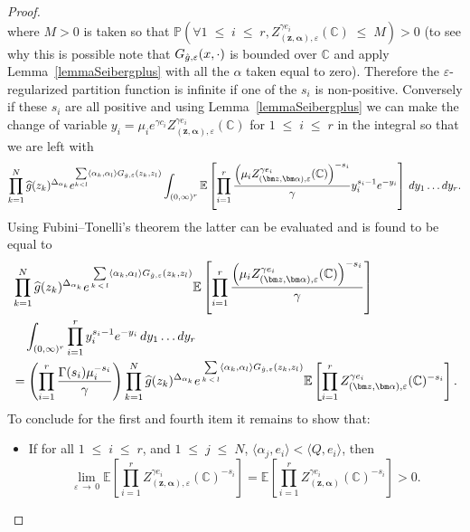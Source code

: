 \documentclass[AHL,Unicode,longabstracts,published]{cedram}
\renewcommand{\leq}{\;\leqslant\;}
\newcommand{\C}{\mathbb{C}}
\newcommand{\E}{\mathbb{E}}
\newcommand{\bbP}{\mathbb{P}}
\newcommand{\ps}[1]{\langle #1 \rangle}
\newcommand*\eps{\varepsilon}
\let\oldhat\hat
\renewcommand*{\hat}[1]{\mathchoice{\widehat{#1}}{\widehat{#1}}{\oldhat{#1}}{\oldhat{#1}}}
\let\oldforall\forall
\renewcommand*{\forall}{\mathrel{\oldforall}}
\begin{document}
\begin{proof}
\[\]
where $M>0$ is taken so that $\bbP\left(\forall 1\leq i\leq r,Z_{(\bm z,\bm \alpha),\eps}^{\gamma e_i} (\C) \leq M\right)>0$ (to see why this is possible note that $G_{\hat{g},\eps}(x,\cdot)$ is bounded over $\C$ and apply Lemma~\ref{lemmaSeibergplus} with all the $\alpha$ taken equal to zero). Therefore the $\eps$-regularized partition function is infinite if one of the $s_i$ is non-positive. Conversely if these $s_i$ are all positive and using Lemma~\ref{lemmaSeibergplus} we can make the change of variable $y_i=\mu_i e^{\gamma c_i}Z_{(\bm z,\bm \alpha),\eps}^{\gamma e_i} (\C)$ for $1\leq i\leq r$ in the integral so that we are left with
\begin{align*}
\prod_{k=1}^N \hat g (z_k)^{\Delta_{\alpha_k}}e^{ \sum\limits_{ k < l} \left\langle\alpha_k,\alpha_l \right\rangle G_{\hat g,\eps}(z_k,z_l) }\int_{ (0,\infty)^{r}} \E \left[\prod_{i=1}^{r} \frac{\left(\mu_i Z_{(\bm z,\bm \alpha),\eps}^{\gamma e_i} (\C)\right)^{- s_i}}\gamma y_i^{s_i-1}e^{- y_i} \right]\,dy_1\dots dy_{r}.
\end{align*}
Using Fubini--Tonelli's theorem the latter can be evaluated and is found to be equal to
\begin{align*}
&\prod_{k=1}^N \hat g (z_k)^{\Delta_{\alpha_k}}e^{\,\sum\limits_{ k\,<\,l} \left\langle\alpha_k,\alpha_l \right\rangle G_{\hat g,\eps}(z_k,z_l) }\E \left [\prod_{i=1}^{r} \frac{\left(\mu_i Z_{(\bm z,\bm \alpha),\eps}^{\gamma e_i} (\C)\right)^{- s_i}}\gamma \right]\\
&\quad\int_{ (0,\infty)^{r}} \prod_{i=1}^{r} y_i^{s_i-1}e^{- y_i} \,dy_1\dots dy_{r}\\
&=\left (\prod_{i=1}^{r} \frac{\Gamma (s_i)\mu_i^{- s_i}}\gamma \right)\prod_{k=1}^N \hat g (z_k)^{\Delta_{\alpha_k}} e^{\,\sum\limits_{ k\,<\,l} \langle\alpha_k,\alpha_l \rangle G_{\hat g,\eps}(z_k,z_l) } \E \left [\prod_{i=1}^{r} Z_{\left(\bm z,\bm \alpha\right),\eps}^{\gamma e_i} (\C)^{- s_i} \right].
\end{align*}
To conclude for the first and fourth item it remains to show that:
\begin{itemize}
\item If for all $1\leq i \leq r$, and $1\leq j\leq N$, $\ps{\alpha_j,e_i}<\ps{Q,e_i}$, then
\begin{equation*}
\lim\limits_{\eps\,\rightarrow\,0}\E \left [\prod_{i=1}^{r} Z_{\left(\bm z,\bm \alpha\right), \eps}^{\gamma e_i} (\C)^{- s_i} \right]=\E \left [\prod_{i=1}^{r} Z_{\left(\bm z,\bm \alpha\right)}^{\gamma e_i} (\C)^{- s_i} \right]>0.
\end{equation*}

\end{itemize}
\end{proof}
\end{document}
